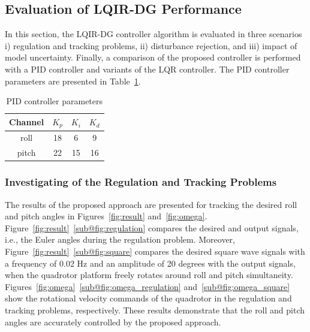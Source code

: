 \documentclass[3p]{elsarticle}
\begin{document}
\subsection{Evaluation of LQIR-DG Performance}
\noindent In this section, the LQIR-DG controller algorithm is evaluated in three scenarios i) regulation and tracking problems, ii) disturbance rejection, and iii) impact of model uncertainty.
Finally, a comparison of the proposed controller is performed with a PID controller and variants of the LQR controller. 
The PID controller parameters are presented in Table~\ref{tab:PID_parameters}.
\begin{table}[H]
    \renewcommand{\arraystretch}{1.3}
    \caption{PID controller parameters}
    \vspace{-0.5cm}
    \begin{center}
        \begin{tabular}{cccc}
        \hline
        \textbf{Channel} & \textbf{$K_p$} & \textbf{$K_i$} & \textbf{$K_d$} \\
        \hline
        roll & 18 & 6 & 9 \\
        pitch & 22 & 15 & 16 \\
        \hline
        \end{tabular}
        \label{tab:PID_parameters}
    \end{center}
\end{table}
\subsubsection{Investigating of the Regulation and Tracking Problems}\label{sec:regulation}
\noindent The results of the proposed approach are presented for tracking the desired roll and pitch angles in Figures~\ref{fig:result} and~\ref{fig:omega}.
Figure~\ref{fig:result}~\ref{sub@fig:regulation} compares the desired and output signals, i.e., the Euler angles during the regulation problem. Moreover, Figure~\ref{fig:result}~\ref{sub@fig:square} compares the desired square wave signals with a frequency of 0.02 Hz and an amplitude of 20 degrees with the output signals, when the quadrotor platform freely rotates around roll and pitch simultaneity.
Figures~\ref{fig:omega}~\ref{sub@fig:omega_regulation} and~\ref{sub@fig:omega_square} show the rotational velocity commands of the quadrotor in the regulation and tracking problems, respectively. These results demonstrate that the roll and pitch angles are accurately controlled by the proposed approach.
\end{document}
